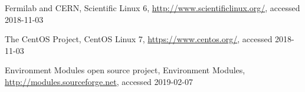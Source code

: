 \begin{thebibliography}{}
Fermilab and CERN,
Scientific Linux 6,
\url{http://www.scientificlinux.org/}, accessed 2018-11-03

The CentOS Project,
CentOS Linux 7,
\url{https://www.centos.org/}, accessed 2018-11-03

Environment Modules open source project,
Environment Modules,
\url{http://modules.sourceforge.net}, accessed 2019-02-07



\end{thebibliography}



